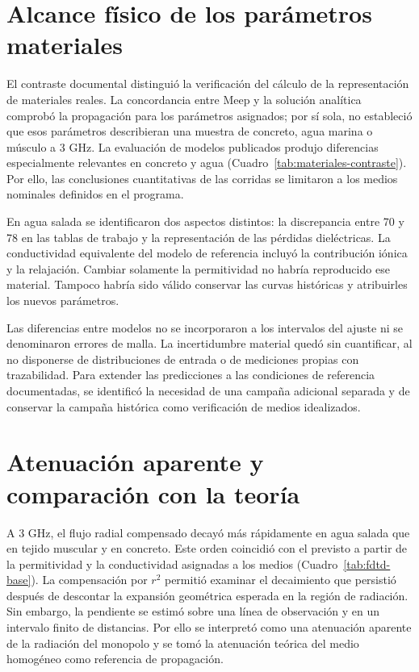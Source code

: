 \section{Alcance físico de los parámetros materiales}
El contraste documental distinguió la verificación del cálculo de la representación de materiales reales. La concordancia entre Meep y la solución analítica comprobó la propagación para los parámetros asignados; por sí sola, no estableció que esos parámetros describieran una muestra de concreto, agua marina o músculo a 3 GHz. La evaluación de modelos publicados produjo diferencias especialmente relevantes en concreto y agua (Cuadro~\ref{tab:materiales-contraste}). Por ello, las conclusiones cuantitativas de las corridas se limitaron a los medios nominales definidos en el programa.

En agua salada se identificaron dos aspectos distintos: la discrepancia entre 70 y 78 en las tablas de trabajo y la representación de las pérdidas dieléctricas. La conductividad equivalente del modelo de referencia incluyó la contribución iónica y la relajación. Cambiar solamente la permitividad no habría reproducido ese material. Tampoco habría sido válido conservar las curvas históricas y atribuirles los nuevos parámetros.

Las diferencias entre modelos no se incorporaron a los intervalos del ajuste ni se denominaron errores de malla. La incertidumbre material quedó sin cuantificar, al no disponerse de distribuciones de entrada o de mediciones propias con trazabilidad. Para extender las predicciones a las condiciones de referencia documentadas, se identificó la necesidad de una campaña adicional separada y de conservar la campaña histórica como verificación de medios idealizados.

\section{Atenuación aparente y comparación con la teoría}
A 3 GHz, el flujo radial compensado decayó más rápidamente en agua salada que en tejido muscular y en concreto. Este orden coincidió con el previsto a partir de la permitividad y la conductividad asignadas a los medios (Cuadro~\ref{tab:fdtd-base}). La compensación por $r^2$ permitió examinar el decaimiento que persistió después de descontar la expansión geométrica esperada en la región de radiación. Sin embargo, la pendiente se estimó sobre una línea de observación y en un intervalo finito de distancias. Por ello se interpretó como una atenuación aparente de la radiación del monopolo y se tomó la atenuación teórica del medio homogéneo como referencia de propagación.

